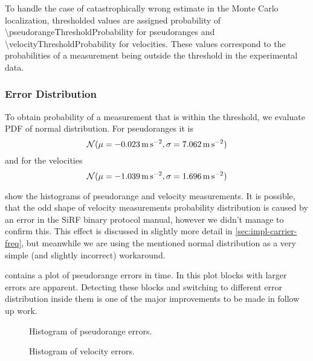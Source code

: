 To handle the case of catastrophically wrong estimate in the Monte Carlo localization,
thresholded values are assigned probability of \num{\pseudorangeThresholdProbability} for
pseudoranges and \num{\velocityThresholdProbability} for velocities.
These values correspond to the probabilities of a measurement being outside the
threshold in the experimental data.

\subsubsection{Error Distribution}
To obtain probability of a measurement that is within the threshold, we evaluate
PDF of normal distribution.
For pseudoranges it is
\begin{equation}
\operatorname{\mathcal{N}}(\mu = \SI{-0.023}{\meter\per\second\squared}, \sigma = \SI{7.062}{\meter\per\second\squared})
\end{equation}
and for the velocities
\begin{equation}
\operatorname{\mathcal{N}}(\mu = \SI{-1.039}{\meter\per\second\squared}, \sigma = \SI{1.696}{\meter\per\second\squared})
\end{equation}

 show the histograms of pseudorange
and velocity measurements.
It is possible, that the odd shape of velocity measurements probability distribution
is caused by an error in the SiRF binary protocol manual, however we didn't manage
to confirm this.
This effect is discussed in slightly more detail in \cref{sec:impl-carrier-freq},
but meanwhile we are using the mentioned normal distribution as a very simple
(and slightly incorrect) workaround.

 contains a plot of pseudorange errors in time.
In this plot blocks with larger errors are apparent.
Detecting these blocks and switching to different error distribution inside them
is one of the major improvements to be made in follow up work.

\begin{figure}[p]
	\centering
	\noindent{}
	\caption{Histogram of pseudorange errors.}
	\label{fig:pseudorange-hist}
\end{figure}

\begin{figure}[p]
	\centering
	\noindent{}
	\caption{Histogram of velocity errors.}
	\label{fig:velocity-hist}
\end{figure}

